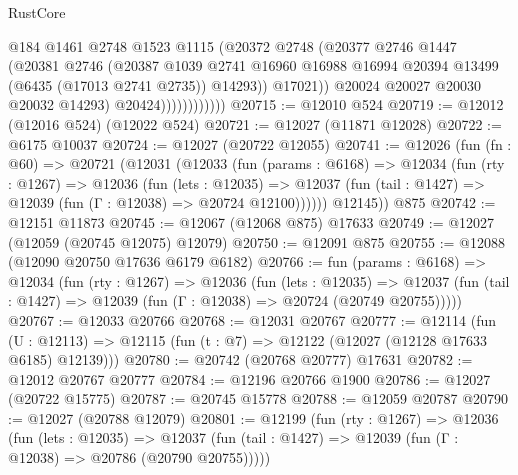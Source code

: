 \begin{lexlean}{RustCore}
\begin{coremodule}
                              @184
                              @1461
                              @2748
                              @1523
                              @1115
                              (@20372
                                @2748
                                (@20377
                                  @2746
                                  @1447
                                  (@20381
                                    @2746
                                    (@20387
                                      @1039
                                      @2741
                                      @16960
                                      @16988
                                      @16994
                                      @20394
                                      @13499
                                      (@6435 (@17013 @2741 @2735))
                                      @14293))
                                  @17021))
                              @20024
                              @20027
                              @20030
                              @20032
                              @14293)
                            @20424))))))))))))
@20715 := @12010 @524
@20719 := @12012 (@12016 @524) (@12022 @524)
@20721 := @12027 (@11871 @12028)
@20722 := @6175 @10037
@20724 := @12027 (@20722 @12055)
@20741 := @12026
    (fun (fn : @60) =>
    @20721
      (@12031
        (@12033
          (fun (params : @6168) =>
          @12034
            (fun (rty : @1267) =>
            @12036
              (fun (lets : @12035) =>
              @12037 (fun (tail : @1427) => @12039 (fun (Γ : @12038) => @20724 @12100))))))
        @12145))
    @875
@20742 := @12151 @11873
@20745 := @12067 (@12068 @875) @17633
@20749 := @12027 (@12059 (@20745 @12075) @12079)
@20750 := @12091 @875
@20755 := @12088 (@12090 @20750 @17636 @6179 @6182)
@20766 := fun (params : @6168) =>
  @12034
    (fun (rty : @1267) =>
    @12036
      (fun (lets : @12035) =>
      @12037 (fun (tail : @1427) => @12039 (fun (Γ : @12038) => @20724 (@20749 @20755)))))
@20767 := @12033 @20766
@20768 := @12031 @20767
@20777 := @12114
    (fun (U : @12113) => @12115 (fun (t : @7) => @12122 (@12027 (@12128 @17633 @6185) @12139)))
@20780 := @20742 (@20768 @20777) @17631
@20782 := @12012 @20767 @20777
@20784 := @12196 @20766 @1900
@20786 := @12027 (@20722 @15775)
@20787 := @20745 @15778
@20788 := @12059 @20787
@20790 := @12027 (@20788 @12079)
@20801 := @12199
    (fun (rty : @1267) =>
    @12036
      (fun (lets : @12035) =>
      @12037 (fun (tail : @1427) => @12039 (fun (Γ : @12038) => @20786 (@20790 @20755)))))

\end{coremodule}
\end{lexlean}
